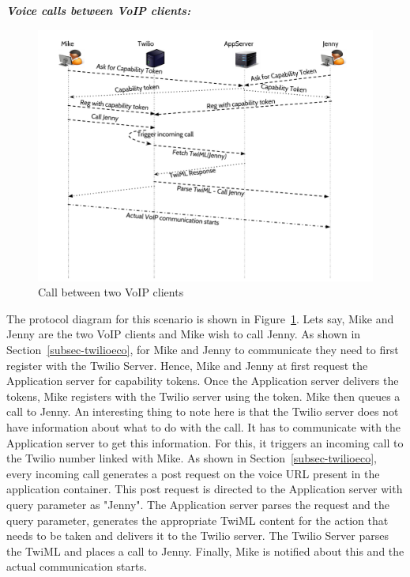 \emph{\textbf{Voice calls between VoIP clients:} }
\begin{figure}[t!] 
\centering
  \includegraphics[width=\textwidth]{figs/twoclients.pdf}
\caption{Call between two VoIP clients}
\label{fig:2VoIPcall}
\end{figure}
The protocol diagram for this scenario is shown in Figure~\ref{fig:2VoIPcall}. Lets say, Mike and Jenny are the two VoIP clients and Mike wish to call Jenny. As shown in Section~\ref{subsec-twilioeco}, for Mike and Jenny to communicate they need to first register with the Twilio Server. Hence, Mike and Jenny at first request the Application server for capability tokens. Once the Application server delivers the tokens, Mike registers with the Twilio server using the token. Mike then queues a call to Jenny. An interesting thing to note here is that the Twilio server does not have information about what to do with the call. It has to communicate with the Application server to get this information. For this, it triggers an incoming call to the Twilio number linked with Mike. As shown in Section~\ref{subsec-twilioeco}, every incoming call generates a post request on the voice URL present in the application container. This post request is directed to the Application server with query parameter as "Jenny". The Application server parses the request and the query parameter, generates the appropriate TwiML content for the action that needs to be taken and delivers it to the Twilio server. The Twilio Server parses the TwiML and places a call to Jenny. Finally, Mike is notified about this and the actual communication starts. 

